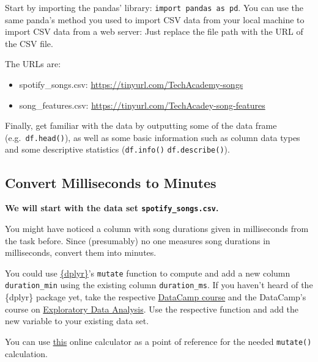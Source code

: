 \documentclass[
  11pt,
]{book}
\providecommand{\tightlist}{%
  \setlength{\itemsep}{0pt}\setlength{\parskip}{0pt}}
\newenvironment{tips}[1]
  {
  \begin{itemize}
  \footnotesize
  \renewcommand{\labelitemi}{
    \raisebox{-.7\height}[0pt][0pt]{
      {\setkeys{Gin}{width=3em,keepaspectratio}
        \texttt{[image: images/\#1.png]}}
    }
  }
  \setlength{\fboxsep}{1em}
  \begin{rbox}
  \item
  }
  {
  \end{rbox}
  \end{itemize}
  }
\newenvironment{tipsp}[1]
  {
  \begin{itemize}
  \footnotesize
  \renewcommand{\labelitemi}{
    \raisebox{-.7\height}[0pt][0pt]{
      {\setkeys{Gin}{width=3em,keepaspectratio}
        \texttt{[image: images/\#1.png]}}
    }
  }
  \setlength{\fboxsep}{1em}
  \begin{pbox}
  \item
  }
  {
  \end{pbox}
  \end{itemize}
  }
\begin{document}
\begin{tipsp}p

Start by importing the pandas' library: \texttt{import\ pandas\ as\ pd}.
You can use the same panda's method you used to import CSV data from your local machine to import CSV data from a web server: Just replace the file path with the URL of the CSV file.

The URLs are:

\begin{itemize}
\tightlist
\item
  spotify\_songs.csv: \url{https://tinyurl.com/TechAcademy-songs}
\item
  song\_features.csv: \url{https://tinyurl.com/TechAcadey-song-features}
\end{itemize}

Finally, get familiar with the data by outputting some of the data frame (e.g.~\texttt{df.head()}), as well as some basic information such as column data types and some descriptive statistics (\texttt{df.info()} \texttt{df.describe()}).

\end{tipsp}

\hypertarget{convert-milliseconds-to-minutes}{%
\subsection{Convert Milliseconds to Minutes}\label{convert-milliseconds-to-minutes}}

\textbf{We will start with the data set \texttt{spotify\_songs.csv}.}

You might have noticed a column with song durations given in milliseconds from the task before. Since (presumably) no one measures song durations in milliseconds, convert them into minutes.

\begin{tips}r

You could use \href{https://dplyr.tidyverse.org/index.html}{\{dplyr\}}'s \texttt{mutate} function to compute and add a new column \texttt{duration\_min} using the existing column \texttt{duration\_ms}. If you haven't heard of the \{dplyr\} package yet, take the respective \href{https://www.datacamp.com/courses/data-manipulation-with-dplyr}{DataCamp course} and the DataCamp's course on \href{https://www.datacamp.com/courses/exploratory-data-analysis}{Exploratory Data Analysis}. Use the respective function and add the new variable to your existing data set.

You can use \href{https://www.timecalculator.net/milliseconds-to-minutes}{this} online calculator as a point of reference for the needed \texttt{mutate()} calculation.

\end{tips}
\end{document}
